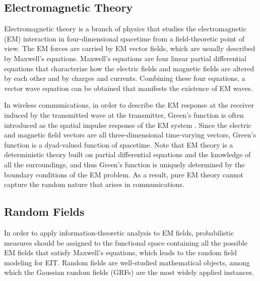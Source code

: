 \documentclass[journal,twocolumn]{IEEEtran}
\begin{document}

\subsection{Electromagnetic Theory}
\label{Sec_2_Subsec_3}
Electromagnetic theory is a branch of physics that studies the electromagnetic (EM) interaction in four-dimensional spacetime from a field-theoretic point of view. The EM forces are carried by EM vector fields, which are usually described by Maxwell's equations. Maxwell's equations are four linear partial differential equations that characterize how the electric fields and magnetic fields are altered by each other and by charges and currents. Combining these four equations, a vector wave equation can be obtained that manifests the existence of EM waves. 

In wireless communications, in order to describe the EM response at the receiver induced by the transmitted wave at the transmitter, Green's function is often introduced as the spatial impulse response of the EM system \cite{stratton2007electromagnetic}. Since the electric and magnetic field vectors are all three-dimensional time-varying vectors, Green's function is a dyad-valued function of spacetime. 
Note that EM theory is a deterministic theory built on partial differential equations and the knowledge of all the surroundings, and thus Green's function is uniquely determined by the boundary conditions of the EM problem.
As a result, pure EM theory cannot capture the random nature that arises in communications. 

\subsection{Random Fields}
\label{Sec_2_Subsec_4}
In order to apply information-theoretic analysis to EM fields, probabilistic measures should be assigned to the functional space containing all the possible EM fields that satisfy Maxwell's equations, which leads to the random field modeling for EIT. 
Random fields are well-studied mathematical objects, among which the Gaussian random fields (GRFs) are the most widely applied instances. 
\end{document}
